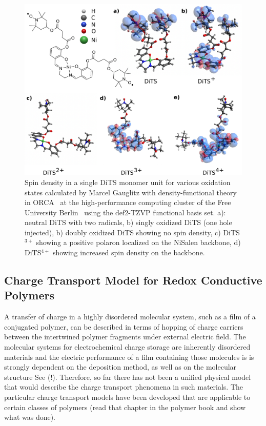 \begin{figure}[h]
\center
	\includegraphics[width=1\textwidth]{./electrochemistry/figures/DFT_DITS.pdf}
	\caption{Spin density in a single DiTS monomer unit for various oxidation states calculated by Marcel Gauglitz with density-functional theory in ORCA~\cite{ORCA} at the high-performance computing cluster of the Free University Berlin~\cite{HPC_FUB} using the def2-TZVP functional basis set. a): neutral DiTS with two radicals, b) singly oxidized DiTS (one hole injected), b) doubly oxidized DiTS showing no spin density, c) DiTS$^{3+}$ showing a positive polaron localized on the NiSalen backbone, d) DiTS$^{4+}$ showing increased spin density on the backbone.}
	\label{fig:DiTS_DFT}
\end{figure}



\subsection{Charge Transport Model for Redox Conductive Polymers}
A transfer of charge in a highly disordered molecular system, such as a film of a conjugated polymer, can be described in terms of hopping of charge carriers between the intertwined polymer fragments under external electric field. The molecular systems for electrochemical charge storage are inherently disordered materials and the electric performance of a film containing those molecules is is strongly dependent on the deposition method, as well as on the molecular structure See \cite{Xie2021} (!). Therefore, so far there has not been a unified physical model that would describe the charge transport phenomena in such materials. The particular charge transport models have been developed that are applicable to certain classes of polymers (read that chapter in the polymer book and show what was done).

